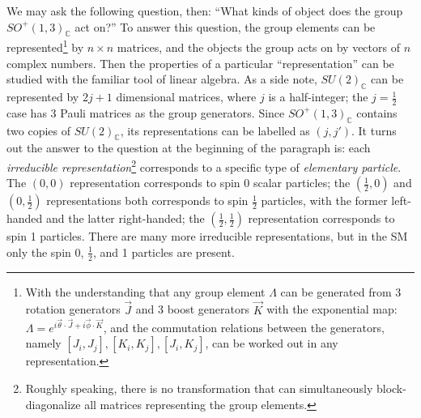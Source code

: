 We may ask the following question, then:
``What kinds of object does the group $SO^+(1,3)_\mathbb{C}$ act on?''
To answer this question, the group elements can be represented\footnote{
    With the understanding that any group element $\Lambda$ can be generated
    from 3 rotation generators $\vec{J}$ and 3 boost generators $\vec{K}$
    with the exponential map:
    $\Lambda = e^{i \vec{\theta} \cdot \vec{J} + i \vec{\phi} \cdot \vec{K}}$,
    and the commutation relations between the generators,
    namely $[J_i, J_j], [K_i, K_j], [J_i, K_j]$,
    can be worked out in any representation.
} by $n \times n$ matrices,
and the objects the group acts on by vectors of $n$ complex numbers.
Then the properties of a particular ``representation'' can be studied with
the familiar tool of linear algebra.
As a side note,
$SU(2)_\mathbb{C}$ can be represented by $2j + 1$ dimensional matrices,
where $j$ is a half-integer;
the $j = \frac{1}{2}$ case has 3 Pauli matrices as the group generators.
Since $SO^+(1,3)_\mathbb{C}$ contains two copies of $SU(2)_\mathbb{C}$,
its representations can be labelled as $(j, j')$.
It turns out the answer to the question at the beginning of the paragraph is:
each \emph{irreducible representation}\footnote{
    Roughly speaking, there is no transformation that can simultaneously
    block-diagonalize all matrices representing the group elements.
}
corresponds to a specific type of \emph{elementary particle}.
The $(0, 0)$ representation corresponds to spin 0 scalar particles;
the $(\frac{1}{2}, 0)$ and $(0, \frac{1}{2})$ representations both corresponds to
spin $\frac{1}{2}$ particles,
with the former left-handed and the latter right-handed;
the $(\frac{1}{2}, \frac{1}{2})$
representation corresponds to spin 1 particles.
There are many more irreducible representations,
but in the SM only the spin 0, $\frac{1}{2}$, and 1 particles are present.

